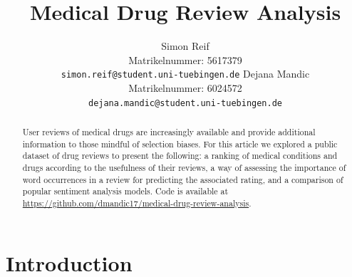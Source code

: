 \documentclass{article}
\title{Medical Drug Review Analysis}
\author{%
  Simon Reif\\
  Matrikelnummer: 5617379\\
  \texttt{\small{simon.reif@student.uni-tuebingen.de}}
  \And
  Dejana Mandic\\
  Matrikelnummer: 6024572\\
  \texttt{\small{dejana.mandic@student.uni-tuebingen.de}}
}
\begin{document}
\maketitle

\begin{abstract}
User reviews of medical drugs are increasingly available and provide additional information to those mindful of selection biases. For this article we explored a public dataset of drug reviews to present the following: a ranking of medical conditions and drugs according to the usefulness of their reviews, a way of assessing the importance of word occurrences in a review for predicting the associated rating, and a comparison of popular sentiment analysis models.
Code is available at \href{https://github.com/dmandic17/medical-drug-review-analysis}{https://github.com/dmandic17/medical-drug-review-analysis}. 



\end{abstract}

\section{Introduction}
 
\end{document}
